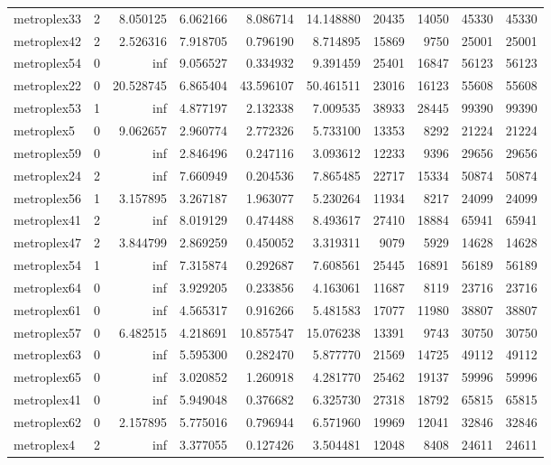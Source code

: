 \begin{longtable}{|l|r|r|r|r|r|r|r|r|r|}
metroplex33 & 2 & 8.050125 & 6.062166 & 8.086714 & 14.148880 & 20435 & 14050 & 45330 & 45330 \\
metroplex42 & 2 & 2.526316 & 7.918705 & 0.796190 & 8.714895 & 15869 & 9750 & 25001 & 25001 \\
metroplex54 & 0 & inf & 9.056527 & 0.334932 & 9.391459 & 25401 & 16847 & 56123 & 56123 \\
metroplex22 & 0 & 20.528745 & 6.865404 & 43.596107 & 50.461511 & 23016 & 16123 & 55608 & 55608 \\
metroplex53 & 1 & inf & 4.877197 & 2.132338 & 7.009535 & 38933 & 28445 & 99390 & 99390 \\
metroplex5 & 0 & 9.062657 & 2.960774 & 2.772326 & 5.733100 & 13353 & 8292 & 21224 & 21224 \\
metroplex59 & 0 & inf & 2.846496 & 0.247116 & 3.093612 & 12233 & 9396 & 29656 & 29656 \\
metroplex24 & 2 & inf & 7.660949 & 0.204536 & 7.865485 & 22717 & 15334 & 50874 & 50874 \\
metroplex56 & 1 & 3.157895 & 3.267187 & 1.963077 & 5.230264 & 11934 & 8217 & 24099 & 24099 \\
metroplex41 & 2 & inf & 8.019129 & 0.474488 & 8.493617 & 27410 & 18884 & 65941 & 65941 \\
metroplex47 & 2 & 3.844799 & 2.869259 & 0.450052 & 3.319311 & 9079 & 5929 & 14628 & 14628 \\
metroplex54 & 1 & inf & 7.315874 & 0.292687 & 7.608561 & 25445 & 16891 & 56189 & 56189 \\
metroplex64 & 0 & inf & 3.929205 & 0.233856 & 4.163061 & 11687 & 8119 & 23716 & 23716 \\
metroplex61 & 0 & inf & 4.565317 & 0.916266 & 5.481583 & 17077 & 11980 & 38807 & 38807 \\
metroplex57 & 0 & 6.482515 & 4.218691 & 10.857547 & 15.076238 & 13391 & 9743 & 30750 & 30750 \\
metroplex63 & 0 & inf & 5.595300 & 0.282470 & 5.877770 & 21569 & 14725 & 49112 & 49112 \\
metroplex65 & 0 & inf & 3.020852 & 1.260918 & 4.281770 & 25462 & 19137 & 59996 & 59996 \\
metroplex41 & 0 & inf & 5.949048 & 0.376682 & 6.325730 & 27318 & 18792 & 65815 & 65815 \\
metroplex62 & 0 & 2.157895 & 5.775016 & 0.796944 & 6.571960 & 19969 & 12041 & 32846 & 32846 \\
metroplex4 & 2 & inf & 3.377055 & 0.127426 & 3.504481 & 12048 & 8408 & 24611 & 24611 \\

\end{longtable}
